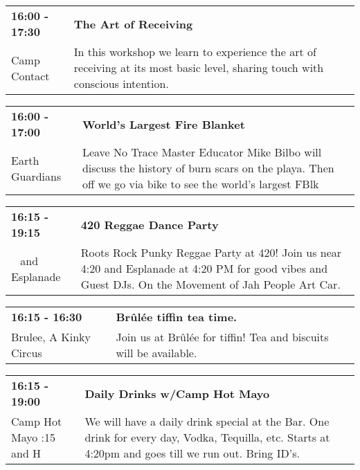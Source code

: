 \begin{tabular}{ p{1in} p{2.2in} }
    \textbf{16:00 - 17:30} & \textbf{The Art of Receiving} \\
    Camp Contact \newline  & In this workshop we learn to experience the art of receiving at its most basic level, sharing touch with conscious intention. \\
    \hline 
\end{tabular}
    
\begin{tabular}{ p{1in} p{2.2in} }
    \textbf{16:00 - 17:00} & \textbf{World's Largest Fire Blanket} \\
    Earth Guardians \newline  & Leave No Trace Master Educator Mike Bilbo will discuss the history of burn scars on the playa. Then off we go via bike to see the world's largest FBlk \\
    \hline 
\end{tabular}
    
\begin{tabular}{ p{1in} p{2.2in} }
    \textbf{16:15 - 19:15} & \textbf{420 Reggae Dance Party} \\
    ~ \newline 420 and Esplanade  & Roots Rock Punky Reggae Party at 420! Join us near 4:20 and Esplanade at 4:20 PM for good vibes and Guest DJs. On the Movement of Jah People Art Car. \\
    \hline 
\end{tabular}
    
\begin{tabular}{ p{1in} p{2.2in} }
    \textbf{16:15 - 16:30} & \textbf{Br\^ul\'ee tiffin tea time.} \\
    Brulee, A Kinky Circus \newline  & Join us at Br\^ul\'ee for tiffin! Tea and biscuits will be available. \\
    \hline 
\end{tabular}
    
\begin{tabular}{ p{1in} p{2.2in} }
    \textbf{16:15 - 19:00} & \textbf{Daily Drinks w/Camp Hot Mayo} \\
    Camp Hot Mayo \newline 9:15 and H & We will have a daily drink special at the Bar.  One drink for every day, Vodka, Tequilla, etc.  Starts at 4:20pm and goes till we run out. Bring ID's. \\
    \hline 
\end{tabular}
    
